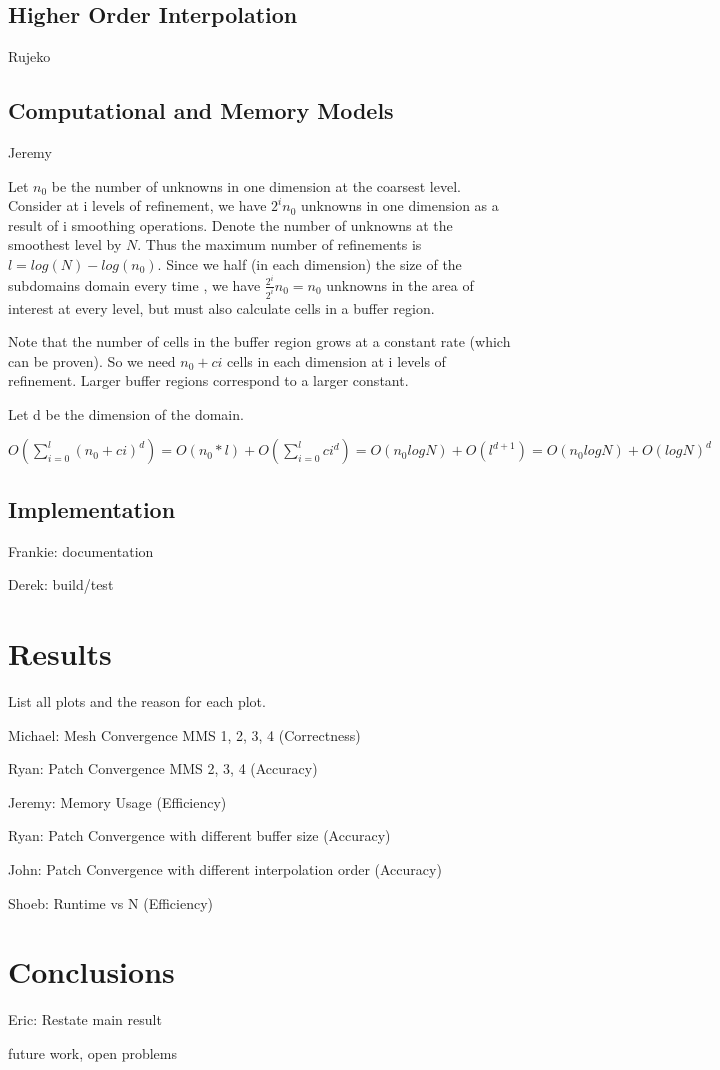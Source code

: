 \subsection{Higher Order Interpolation}

Rujeko

\subsection{Computational and Memory Models}

Jeremy

Let $n_0$ be the number of unknowns in one dimension at the coarsest level. Consider at i levels of refinement, we have $2^i n_0$ unknowns in one dimension as a result of i smoothing operations. Denote the  number of unknowns at the smoothest level by $N$.  Thus the maximum number of refinements is $l = log(N) - log(n_0)$. Since we half (in each dimension) the size of the subdomains domain every time , we have $\frac{2^i}{2^i} n_0 = n_0$ unknowns in the area of interest at every level, but must also calculate cells in a buffer region. 

Note that the number of cells in the buffer region grows at a constant rate (which can be proven). So we need $n_0 + c i$ cells in each dimension at i levels of refinement. Larger buffer regions correspond to a larger constant. 

Let d be the dimension of the domain. 

$O(\sum_{i=0}^l (n_0 + c i)^d) = O(n_0 * l) + O(\sum_{i=0}^l c i^d) = O(n_0 logN) + O(l^{d+1}) = O( n_0 log N) + O(logN)^d $
\subsection{Implementation}

Frankie: documentation

Derek: build/test

\section{Results}\label{sec:results}

List all plots and the reason for each plot.

Michael: Mesh Convergence MMS 1, 2, 3, 4 (Correctness)

Ryan: Patch Convergence MMS 2, 3, 4 (Accuracy)

Jeremy: Memory Usage (Efficiency)

Ryan: Patch Convergence with different buffer size (Accuracy)

John: Patch Convergence with different interpolation order (Accuracy)

Shoeb: Runtime vs N (Efficiency)

\section{Conclusions}

Eric: Restate main result

future work, open problems
